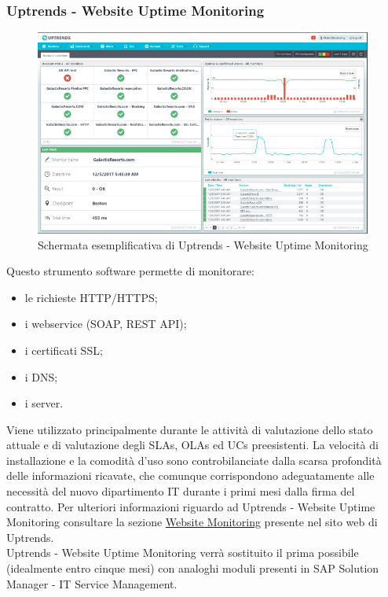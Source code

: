 \subsubsection{Uptrends - Website Uptime Monitoring}

\begin{figure}[H]
\centering
\includegraphics[width=30em]{immagini/sla/websitemonitor.png}
\caption{Schermata esemplificativa di Uptrends - Website Uptime Monitoring}
\end{figure}

Questo strumento software permette di monitorare:

\begin{itemize}
	\item le richieste HTTP/HTTPS;
    \item i webservice (SOAP, REST API);
    \item i certificati SSL;
    \item i DNS;
    \item i server.
\end{itemize}

Viene utilizzato principalmente durante le attività di valutazione dello stato attuale e di valutazione degli SLAs, OLAs ed UCs preesistenti. La velocità di installazione e la comodità d'uso sono controbilanciate dalla scarsa profondità delle informazioni ricavate, che comunque corrispondono adeguatamente alle necessità del nuovo dipartimento IT durante i primi mesi dalla firma del contratto. Per ulteriori informazioni riguardo ad Uptrends - Website Uptime Monitoring consultare la sezione \href{https://www.uptrends.com/products/website-monitoring}{Website Monitoring} presente nel sito web di Uptrends.
\\
Uptrends - Website Uptime Monitoring verrà sostituito il prima possibile (idealmente entro cinque mesi) con analoghi moduli presenti in SAP Solution Manager - IT Service Management.

